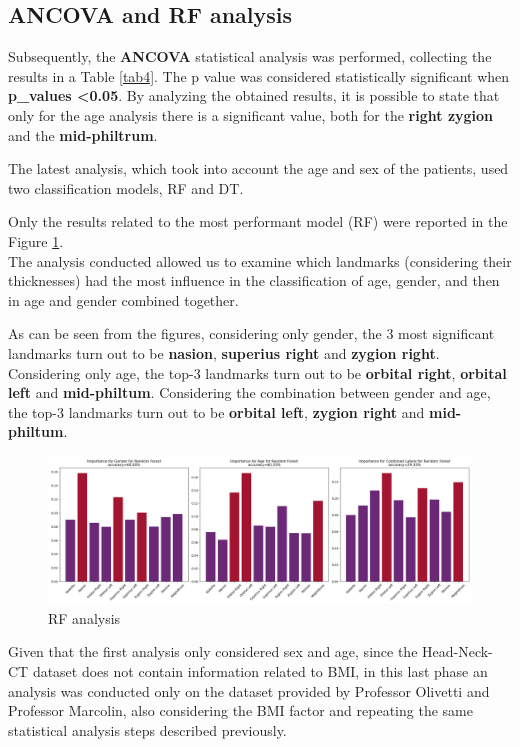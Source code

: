 \documentclass[journal,article,submit,pdftex,moreauthors]{Definitions/mdpi}
\begin{document}
\subsection*{ANCOVA and RF analysis} \label{subsec:ancova-rf-analysis}

Subsequently, the \textbf{ANCOVA} statistical analysis was performed, collecting the results in a Table \ref{tab4}. The p value was considered statistically significant when \textbf{p\_values <0.05}. By analyzing the obtained results, it is possible to state that only for the age analysis there is a significant value, both for the \textbf{right zygion} and the \textbf{mid-philtrum}.

The latest analysis, which took into account the age and sex of the patients, used two classification models, RF and DT. 

Only the results related to the most performant model (RF) were reported in the Figure {\ref{fig:fig6}}. \\ The analysis conducted allowed us to examine which landmarks (considering their thicknesses) had the most influence in the classification of age, gender, and then in age and gender combined together. 

As can be seen from the figures, considering only gender, the 3 most significant landmarks turn out to be \textbf{nasion}, \textbf{superius right} and \textbf{zygion right}. 
Considering only age, the top-3 landmarks turn out to be \textbf{orbital right}, \textbf{orbital left} and \textbf{mid-philtum}.
Considering the combination between gender and age, the top-3 landmarks turn out to be \textbf{orbital left}, \textbf{zygion right} and \textbf{mid-philtum}.

\begin{figure}[H]
    \centering
    \includegraphics[width=1\linewidth]{Definitions/RF_analysis.png}
    \caption{RF analysis}
    \label{fig:fig6}
\end{figure}

Given that the first analysis only considered sex and age, since the Head-Neck-CT dataset does not contain information related to BMI, in this last phase an analysis was conducted only on the dataset provided by Professor Olivetti and Professor Marcolin, also considering the BMI factor and repeating the same statistical analysis steps described previously. 
\end{document}
